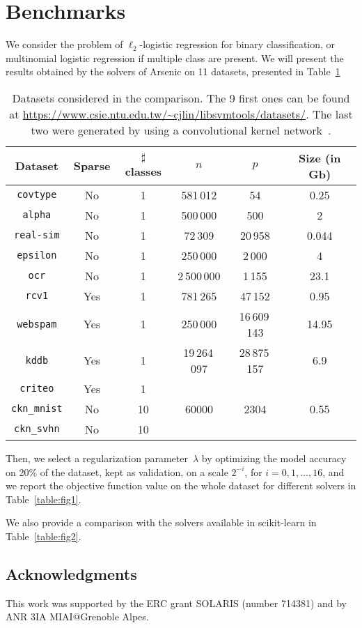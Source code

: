 \documentclass{article}
\begin{document}
\section{Benchmarks}
We consider the problem of $\ell_2$-logistic regression for binary
classification, or multinomial logistic regression if multiple class are
present. We will present the results obtained by the solvers of Arsenic on 11
datasets, presented in Table~\ref{tab:datasets}
\begin{table}[hbtp!]
   \centering
\begin{tabular}{|c|c|c|c|c|c|}
   \hline
   Dataset & Sparse & $\sharp$ classes & $n$ & $p$ & Size (in Gb) \\
   \hline
   \texttt{covtype} & No & 1 & 581\,012 & 54 & 0.25 \\
   \hline
   \texttt{alpha} & No & 1 & 500\,000 & 500 & 2 \\
   \hline
   \texttt{real-sim} & No & 1 & 72\,309 & 20\,958 & 0.044 \\
   \hline
   \texttt{epsilon} & No & 1 & 250\,000 & 2\,000 & 4 \\
   \hline
   \texttt{ocr} & No & 1 & 2\,500\,000 & 1\,155 & 23.1 \\
   \hline
   \texttt{rcv1} & Yes & 1 & 781\,265 & 47\,152 & 0.95 \\
   \hline
   \texttt{webspam} & Yes & 1 & 250\,000 & 16\,609\,143  & 14.95  \\
   \hline
   \texttt{kddb} & Yes & 1 & 19\,264\,097 & 28\,875\,157 & 6.9 \\
   \hline
   \texttt{criteo} & Yes & 1 &  &  &  \\
   \hline
   \texttt{ckn\_mnist} & No & 10 & 60000 & 2304 & 0.55 \\
   \hline
   \texttt{ckn\_svhn} & No & 10 &  &  &  \\
   \hline
\end{tabular} \caption{Datasets considered in the comparison. The 9 first ones can be found at \url{https://www.csie.ntu.edu.tw/~cjlin/libsvmtools/datasets/}. The last two were generated by using a convolutional kernel network~\cite{mairal2016end}. } \label{tab:datasets}
\end{table}

Then, we select a regularization parameter~$\lambda$ by optimizing the model
accuracy on 20\% of the dataset, kept as validation, on a scale $2^{-i}$, for $i=0,1,\ldots,16$,
and we report the objective function value on the whole dataset for different solvers in Table~\ref{table:fig1}.

We also provide a comparison with the solvers available in scikit-learn in Table~\ref{table:fig2}.


\subsection*{Acknowledgments}
This work was supported by the ERC grant SOLARIS (number 714381) and by ANR 3IA MIAI@Grenoble Alpes.



\end{document}
